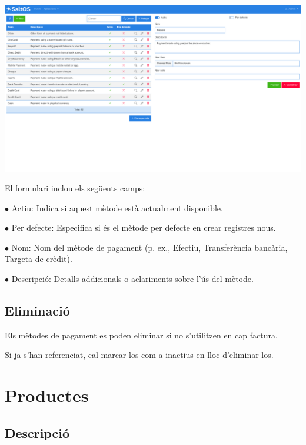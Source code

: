 \documentclass[a4paper]{article}
\begin{document}
\begin{center}\includegraphics[width=1\textwidth]{../ujest/snaps/test-screenshots-js-screenshots-sales-payment-methods-edit-10-ca-es-1-snap.png}\end{center}

El formulari inclou els següents camps:

\begin{compactitem}
\item[\color{myblue}$\bullet$] Actiu: Indica si aquest mètode està actualment disponible.
\item[\color{myblue}$\bullet$] Per defecte: Especifica si és el mètode per defecte en crear registres nous.
\item[\color{myblue}$\bullet$] Nom: Nom del mètode de pagament (p. ex., Efectiu, Transferència bancària, Targeta de crèdit).
\item[\color{myblue}$\bullet$] Descripció: Detalls addicionals o aclariments sobre l'ús del mètode.
\end{compactitem}

\hypertarget{toc150}{}
\subsection{Eliminació}

Els mètodes de pagament es poden eliminar si no s'utilitzen en cap factura.

Si ja s'han referenciat, cal marcar-los com a inactius en lloc d'eliminar-los.


\hypertarget{toc151}{}
\section{Productes}

\hypertarget{toc152}{}
\subsection{Descripció}
\end{document}
